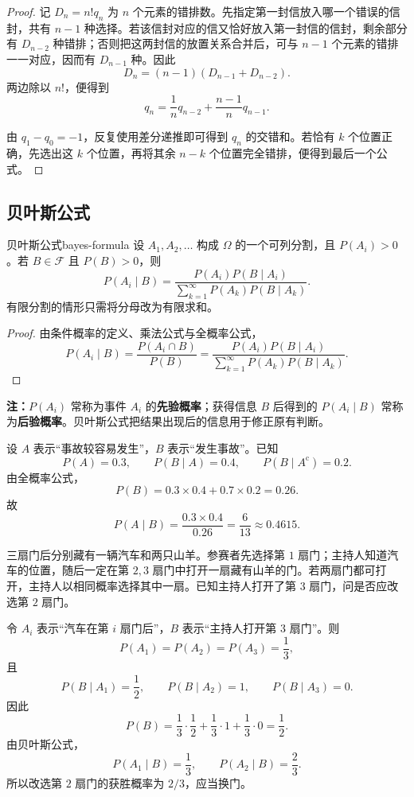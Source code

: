 \begin{proof}
记 $D_n=n!q_n$ 为 $n$ 个元素的错排数。先指定第一封信放入哪一个错误的信封，共有 $n-1$ 种选择。若该信封对应的信又恰好放入第一封信的信封，剩余部分有 $D_{n-2}$ 种错排；否则把这两封信的放置关系合并后，可与 $n-1$ 个元素的错排一一对应，因而有 $D_{n-1}$ 种。因此
\[
D_n=(n-1)(D_{n-1}+D_{n-2}).
\]
两边除以 $n!$，便得到
\[
q_n=\frac1n q_{n-2}+\frac{n-1}{n}q_{n-1}.
\]

由 $q_1-q_0=-1$，反复使用差分递推即可得到 $q_n$ 的交错和。若恰有 $k$ 个位置正确，先选出这 $k$ 个位置，再将其余 $n-k$ 个位置完全错排，便得到最后一个公式。
\end{proof}

\subsection*{贝叶斯公式}

\begin{mytheorem}{贝叶斯公式}{bayes-formula}
设 $A_1,A_2,\ldots$ 构成 $\Omega$ 的一个可列分割，且 $P(A_i)>0$。若 $B\in\mathscr{F}$ 且 $P(B)>0$，则
\[
P(A_i\mid B)
=\frac{P(A_i)P(B\mid A_i)}
{\displaystyle\sum_{k=1}^{\infty}P(A_k)P(B\mid A_k)}.
\]
有限分割的情形只需将分母改为有限求和。
\end{mytheorem}

\begin{proof}
由条件概率的定义、乘法公式与全概率公式，
\[
P(A_i\mid B)
=\frac{P(A_i\cap B)}{P(B)}
=\frac{P(A_i)P(B\mid A_i)}
{\displaystyle\sum_{k=1}^{\infty}P(A_k)P(B\mid A_k)}.
\]
\end{proof}

\textbf{注：}\quad $P(A_i)$ 常称为事件 $A_i$ 的\textbf{先验概率}；获得信息 $B$ 后得到的 $P(A_i\mid B)$ 常称为\textbf{后验概率}。贝叶斯公式把结果出现后的信息用于修正原有判断。

\begin{example}[保险事故原因]
设 $A$ 表示“事故较容易发生”，$B$ 表示“发生事故”。已知
\[
P(A)=0.3,
\qquad
P(B\mid A)=0.4,
\qquad
P(B\mid A^{\mathrm c})=0.2.
\]
由全概率公式，
\[
P(B)=0.3\times0.4+0.7\times0.2=0.26.
\]
故
\[
P(A\mid B)
=\frac{0.3\times0.4}{0.26}
=\frac6{13}
\approx0.4615.
\]
\end{example}

\begin{example}
三扇门后分别藏有一辆汽车和两只山羊。参赛者先选择第 $1$ 扇门；主持人知道汽车的位置，随后一定在第 $2,3$ 扇门中打开一扇藏有山羊的门。若两扇门都可打开，主持人以相同概率选择其中一扇。已知主持人打开了第 $3$ 扇门，问是否应改选第 $2$ 扇门。

令 $A_i$ 表示“汽车在第 $i$ 扇门后”，$B$ 表示“主持人打开第 $3$ 扇门”。则
\[
P(A_1)=P(A_2)=P(A_3)=\frac13,
\]
且
\[
P(B\mid A_1)=\frac12,
\qquad
P(B\mid A_2)=1,
\qquad
P(B\mid A_3)=0.
\]
因此
\[
P(B)=\frac13\cdot\frac12+\frac13\cdot1+\frac13\cdot0=\frac12.
\]
由贝叶斯公式，
\[
P(A_1\mid B)=\frac13,
\qquad
P(A_2\mid B)=\frac23.
\]
所以改选第 $2$ 扇门的获胜概率为 $2/3$，应当换门。
\end{example}

